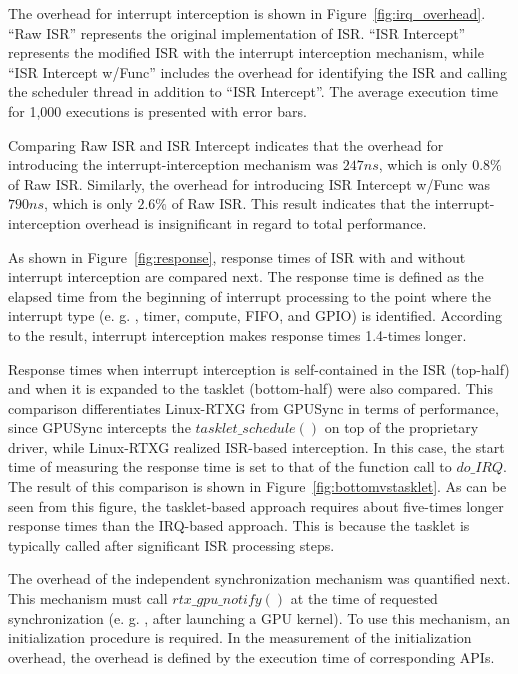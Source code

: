 The overhead for interrupt interception is shown in Figure~\ref{fig:irq_overhead}. ``Raw ISR'' represents the original implementation of ISR.
``ISR Intercept'' represents the modified ISR with the interrupt interception mechanism, while ``ISR Intercept w/Func'' includes the overhead for identifying the ISR and calling the scheduler thread in addition to ``ISR Intercept''.
The average execution time for 1,000 executions is presented with error bars.


Comparing Raw ISR and ISR Intercept indicates that the overhead for introducing the interrupt-interception mechanism was $247ns$, which is only $0.
8\%$ of Raw ISR.
 Similarly, the overhead for introducing ISR Intercept w/Func was $790ns$, which is only $2.
6\%$ of Raw ISR.
 This result indicates that the interrupt-interception overhead is insignificant in regard to total performance.


As shown in Figure~\ref{fig:response}, response times of ISR with and without interrupt interception are compared next.
The response time is defined as the elapsed time from the beginning of interrupt processing to the point where the interrupt type (e.
g.
, timer, compute, FIFO, and GPIO) is identified.
According to the result, interrupt interception makes response times 1.4-times longer.

Response times when interrupt interception is self-contained in the ISR (top-half) and when it is expanded to the tasklet (bottom-half) were also compared.
This comparison differentiates Linux-RTXG from GPUSync in terms of performance, since GPUSync intercepts the $tasklet\_schedule()$ on top of the proprietary driver, while Linux-RTXG realized ISR-based interception.
In this case, the start time of measuring the response time is set to that of the function call to $do\_IRQ$.
The result of this comparison is shown in Figure~\ref{fig:bottomvstasklet}.
As can be seen from this figure, the tasklet-based approach requires about five-times longer response times than the IRQ-based approach.
This is because the tasklet is typically called after significant ISR processing steps.


The overhead of the independent synchronization mechanism was quantified next.
This mechanism must call $rtx\_gpu\_notify()$ at the time of requested synchronization (e.
g.
, after launching a GPU kernel).
To use this mechanism, an initialization procedure is required.
In the measurement of the initialization overhead, the overhead is defined by the execution time of corresponding APIs.


